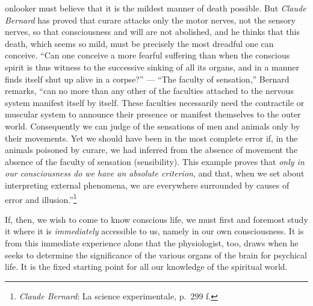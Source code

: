 \documentclass[12pt,a4paper]{book}
\newcommand{\opage}[1]{\marginnote{\footnotesize\textit{[#1]}}}
\begin{document}
onlooker must believe that it is the mildest manner of death
\opage{13}possible. But \emph{Claude Bernard} has proved that curare
attacks only the motor nerves, not the sensory nerves, so that
consciousness and will are not abolished, and he thinks that this death,
which seems so mild, must be precisely the most dreadful one can
conceive. ``Can one conceive a more fearful suffering than when the
conscious spirit is thus witness to the successive sinking of all its
organs, and in a manner finds itself shut up alive in a corpse?'' ---
``The faculty of sensation,'' Bernard remarks, ``can no more than any
other of the faculties attached to the nervous system manifest itself by
itself. These faculties necessarily need the contractile or muscular
system to announce their presence or manifest themselves to the outer
world. Consequently we can judge of the sensations of men and animals
only by their movements. Yet we should have been in the most complete
error if, in the animals poisoned by curare, we had inferred from the
absence of movement the absence of the faculty of sensation
(sensibility). This example proves that \emph{only in our consciousness
do we have an absolute criterion}, and that, when we set about
interpreting external phenomena, we are everywhere surrounded by causes
of error and illusion.''\footnote{\emph{Claude Bernard}: La science
experimentale, p.~299 f.}

If, then, we wish to come to know conscious life, we must first and
foremost study it where it is \emph{immediately} accessible to us,
namely in our own consciousness. It is from this immediate experience
alone that the physiologist, too, draws when he seeks to determine the
significance of the various organs of the brain for psychical life. It
is the fixed starting point for all our knowledge of the spiritual
world.
\end{document}

